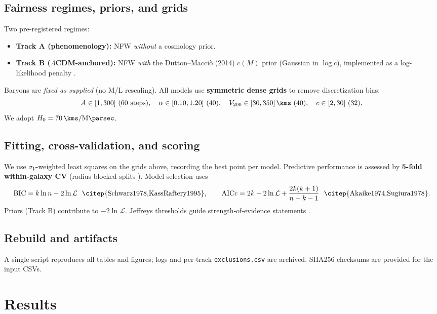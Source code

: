 \documentclass[12pt]{article}
\begin{document}
\subsection*{Fairness regimes, priors, and grids}
Two pre-registered regimes:
\begin{itemize}\itemsep0.2em
\item \textbf{Track A (phenomenology):} NFW \emph{without} a cosmology prior.
\item \textbf{Track B ($\Lambda$CDM-anchored):} NFW \emph{with} the Dutton--Macci\`o (2014) $c(M)$ prior (Gaussian in $\log c$), implemented as a log-likelihood penalty \citep{DuttonMaccio2014}.
\end{itemize}
Baryons are \emph{fixed as supplied} (no M/L rescaling). All models use \textbf{symmetric dense grids} to remove discretization bias:
\[
A\in[1,300]\ \text{(60 steps)},\quad
\alpha\in[0.10,1.20]\ \text{(40)},\quad
V_{200}\in[30,350]\,\si{\kms}\ \text{(40)},\quad
c\in[2,30]\ \text{(32)}.
\]
We adopt $H_0=\SI{70}{\kms\per\mega\parsec}$.

\subsection*{Fitting, cross-validation, and scoring}
We use $\sigma_V$-weighted least squares on the grids above, recording the best point per model. Predictive performance is assessed by \textbf{5-fold within-galaxy CV} (radius‑blocked splits \citep{Stone1974,ArlotCelisse2010}). Model selection uses
\begin{equation}
\mathrm{BIC}=k\ln n - 2\ln\mathcal{L} \ \ \text{\citep{Schwarz1978,KassRaftery1995}},\qquad
\mathrm{AICc}=2k-2\ln\mathcal{L}+\frac{2k(k+1)}{n-k-1}\ \ \text{\citep{Akaike1974,Sugiura1978}}.
\end{equation}
Priors (Track B) contribute to $-2\ln\mathcal{L}$. Jeffreys thresholds guide strength‑of‑evidence statements \citep{Jeffreys1961}.

\subsection*{Rebuild and artifacts}
A single script reproduces all tables and figures; logs and per‑track \texttt{exclusions.csv} are archived. SHA256 checksums are provided for the input CSVs.

\section{Results}
\end{document}
